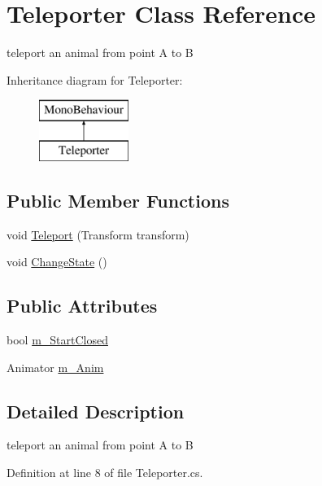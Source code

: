 \hypertarget{class_teleporter}{}\section{Teleporter Class Reference}
\label{class_teleporter}


teleport an animal from point A to B  


Inheritance diagram for Teleporter\+:\begin{figure}[H]
\begin{center}
\leavevmode
\includegraphics[height=2.000000cm]{class_teleporter}
\end{center}
\end{figure}
\subsection*{Public Member Functions}
\begin{DoxyCompactItemize}
\item 
void \mbox{\hyperlink{class_teleporter_a6bb811e6a67e1664b92560845611f401}{Teleport}} (Transform transform)
\item 
void \mbox{\hyperlink{class_teleporter_a112d2c95bfea3c46f4beb3e41fcad824}{Change\+State}} ()
\end{DoxyCompactItemize}
\subsection*{Public Attributes}
\begin{DoxyCompactItemize}
\item 
bool \mbox{\hyperlink{class_teleporter_ad28abcff38d4c5e16ee1f5158bbcdae8}{m\+\_\+\+Start\+Closed}}
\item 
Animator \mbox{\hyperlink{class_teleporter_a3aa6874579f096068dfe27284c981903}{m\+\_\+\+Anim}}
\end{DoxyCompactItemize}


\subsection{Detailed Description}
teleport an animal from point A to B 



Definition at line 8 of file Teleporter.\+cs.



